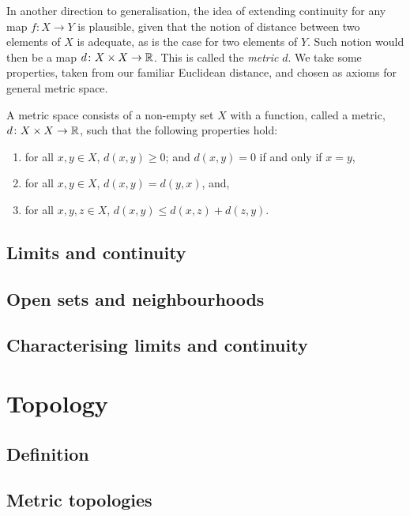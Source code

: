 \documentclass[main.tex]{subfiles}
\begin{document}
		In another direction to generalisation, the idea of extending continuity for any map $f\colon X \to Y$ is plausible, given that the notion of distance between two elements of $X$ is adequate, as is the case for two elements of $Y$. Such notion would then be a map $d\colon X \times X \to \mathbb R$. This is called the \textit{metric} $d$. We take some properties, taken from our familiar Euclidean distance, and chosen as axioms for general metric space.
		\begin{definition}
			A metric space consists of a non-empty set $X$ with a function, called a metric, $d\colon X \times X \to \mathbb R$, such that the following properties hold:
			\begin{enumerate}
				\item for all $x, y \in X$, $d(x, y) \geq 0$; and $d(x, y) = 0$ if and only if $x = y$,
				\item for all $x, y \in X$, $d(x,y) = d(y, x)$, and,
				\item for all $x, y, z\in X$, $d(x,y) \leq d(x,z) + d(z, y)$.
			\end{enumerate}
		\end{definition}
		
	\subsection{Limits and continuity}
	
	\subsection{Open sets and neighbourhoods}
	
	\subsection{Characterising limits and continuity}
	
	\section{Topology}
	\subsection{Definition}
	
	\subsection{Metric topologies}
	
\end{document}
